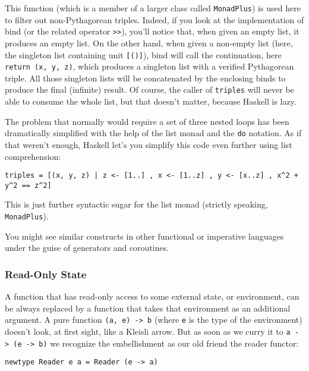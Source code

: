 This function (which is a member of a larger class called
\texttt{MonadPlus}) is used here to filter out non-Pythagorean triples.
Indeed, if you look at the implementation of bind (or the related
operator \texttt{\textgreater{}\textgreater{}}), you'll notice that,
when given an empty list, it produces an empty list. On the other hand,
when given a non-empty list (here, the singleton list containing unit
\texttt{{[}(){]}}), bind will call the continuation, here
\texttt{return\ (x,\ y,\ z)}, which produces a singleton list with a
verified Pythagorean triple. All those singleton lists will be
concatenated by the enclosing binds to produce the final (infinite)
result. Of course, the caller of \texttt{triples} will never be able to
consume the whole list, but that doesn't matter, because Haskell is
lazy.

The problem that normally would require a set of three nested loops has
been dramatically simplified with the help of the list monad and the
\texttt{do} notation. As if that weren't enough, Haskell let's you
simplify this code even further using list comprehension:

\begin{verbatim}
triples = [(x, y, z) | z <- [1..] , x <- [1..z] , y <- [x..z] , x^2 + y^2 == z^2]
\end{verbatim}

This is just further syntactic sugar for the list monad (strictly
speaking, \texttt{MonadPlus}).

You might see similar constructs in other functional or imperative
languages under the guise of generators and coroutines.

\subsubsection{Read-Only State}\label{read-only-state}

A function that has read-only access to some external state, or
environment, can be always replaced by a function that takes that
environment as an additional argument. A pure function
\texttt{(a,\ e)\ -\textgreater{}\ b} (where \texttt{e} is the type of
the environment) doesn't look, at first sight, like a Kleisli arrow. But
as soon as we curry it to
\texttt{a\ -\textgreater{}\ (e\ -\textgreater{}\ b)} we recognize the
embellishment as our old friend the reader functor:

\begin{verbatim}
newtype Reader e a = Reader (e -> a)
\end{verbatim}

